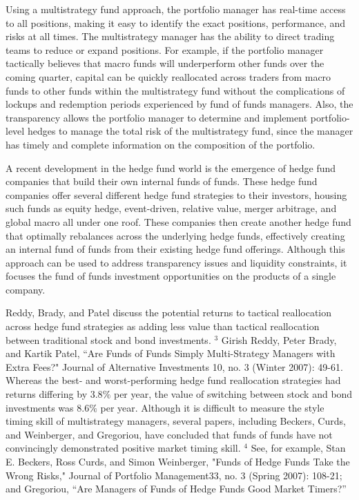 \documentclass[11pt]{article}
\begin{document}
Using a multistrategy fund approach, the portfolio manager has real-time access to all positions, making it easy to identify the exact positions, performance, and risks at all times. The multistrategy manager has the ability to direct trading teams to reduce or expand positions. For example, if the portfolio manager tactically believes that macro funds will underperform other funds over the coming quarter, capital can be quickly reallocated across traders from macro funds to other funds within the multistrategy fund without the complications of lockups and redemption periods experienced by fund of funds managers. Also, the transparency allows the portfolio manager to determine and implement portfolio-level hedges to manage the total risk of the multistrategy fund, since the manager has timely and complete information on the composition of the portfolio.

A recent development in the hedge fund world is the emergence of hedge fund companies that build their own internal funds of funds. These hedge fund companies offer several different hedge fund strategies to their investors, housing such funds as equity hedge, event-driven, relative value, merger arbitrage, and global macro all under one roof. These companies then create another hedge fund that optimally rebalances across the underlying hedge funds, effectively creating an internal fund of funds from their existing hedge fund offerings. Although this approach can be used to address transparency issues and liquidity constraints, it focuses the fund of funds investment opportunities on the products of a single company.

Reddy, Brady, and Patel discuss the potential returns to tactical reallocation across hedge fund strategies as adding less value than tactical reallocation between traditional stock and bond investments. ${ }^{3}$ Girish Reddy, Peter Brady, and Kartik Patel, “Are Funds of Funds Simply Multi-Strategy Managers with Extra Fees?" Journal of Alternative Investments 10, no. 3 (Winter 2007): 49-61. Whereas the best- and worst-performing hedge fund reallocation strategies had returns differing by $3.8 \%$ per year, the value of switching between stock and bond investments was $8.6 \%$ per year. Although it is difficult to measure the style timing skill of multistrategy managers, several papers, including Beckers, Curds, and Weinberger, and Gregoriou, have concluded that funds of funds have not convincingly demonstrated positive market timing skill. ${ }^{4}$ See, for example, Stan E. Beckers, Ross Curds, and Simon Weinberger, "Funds of Hedge Funds Take the Wrong Risks," Journal of Portfolio Management33, no. 3 (Spring 2007): 108-21; and Gregoriou, “Are Managers of Funds of Hedge Funds Good Market Timers?”
\end{document}
